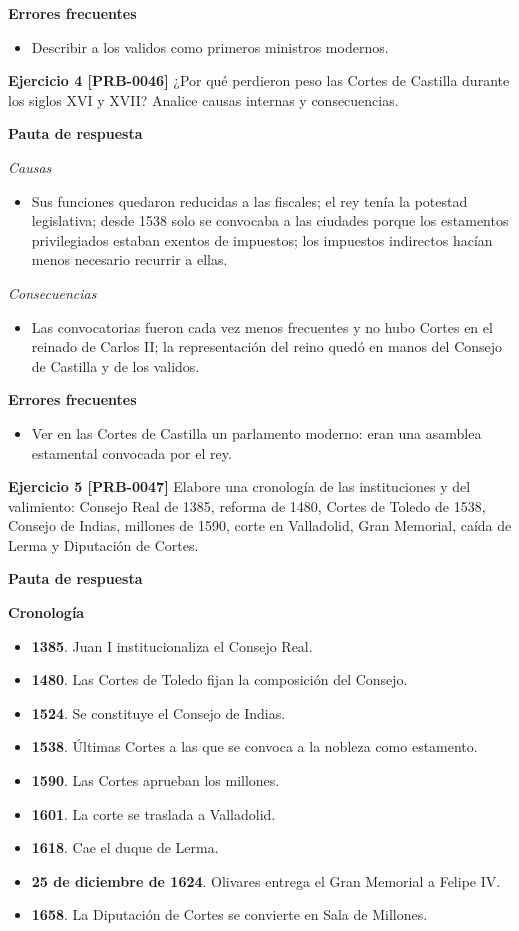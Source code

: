 \documentclass{book}
\begin{document}
\noindent\textbf{Errores frecuentes}
\begin{itemize}
\item Describir a los validos como primeros ministros modernos.
\end{itemize}

\noindent\textbf{Ejercicio 4 [PRB-0046]}
¿Por qué perdieron peso las Cortes de Castilla durante los siglos XVI y XVII? Analice causas internas y consecuencias.


\noindent\textbf{Pauta de respuesta}

\noindent\textit{Causas}
\begin{itemize}
\item Sus funciones quedaron reducidas a las fiscales; el rey tenía la potestad legislativa; desde 1538 solo se convocaba a las ciudades porque los estamentos privilegiados estaban exentos de impuestos; los impuestos indirectos hacían menos necesario recurrir a ellas.
\end{itemize}

\noindent\textit{Consecuencias}
\begin{itemize}
\item Las convocatorias fueron cada vez menos frecuentes y no hubo Cortes en el reinado de Carlos II; la representación del reino quedó en manos del Consejo de Castilla y de los validos.
\end{itemize}

\noindent\textbf{Errores frecuentes}
\begin{itemize}
\item Ver en las Cortes de Castilla un parlamento moderno: eran una asamblea estamental convocada por el rey.
\end{itemize}

\noindent\textbf{Ejercicio 5 [PRB-0047]}
Elabore una cronología de las instituciones y del valimiento: Consejo Real de 1385, reforma de 1480, Cortes de Toledo de 1538, Consejo de Indias, millones de 1590, corte en Valladolid, Gran Memorial, caída de Lerma y Diputación de Cortes.


\noindent\textbf{Pauta de respuesta}

\noindent\textbf{Cronología}
\begin{itemize}
\item \textbf{1385}. Juan I institucionaliza el Consejo Real.
\item \textbf{1480}. Las Cortes de Toledo fijan la composición del Consejo.
\item \textbf{1524}. Se constituye el Consejo de Indias.
\item \textbf{1538}. Últimas Cortes a las que se convoca a la nobleza como estamento.
\item \textbf{1590}. Las Cortes aprueban los millones.
\item \textbf{1601}. La corte se traslada a Valladolid.
\item \textbf{1618}. Cae el duque de Lerma.
\item \textbf{25 de diciembre de 1624}. Olivares entrega el Gran Memorial a Felipe IV.
\item \textbf{1658}. La Diputación de Cortes se convierte en Sala de Millones.
\end{itemize}
\end{document}
